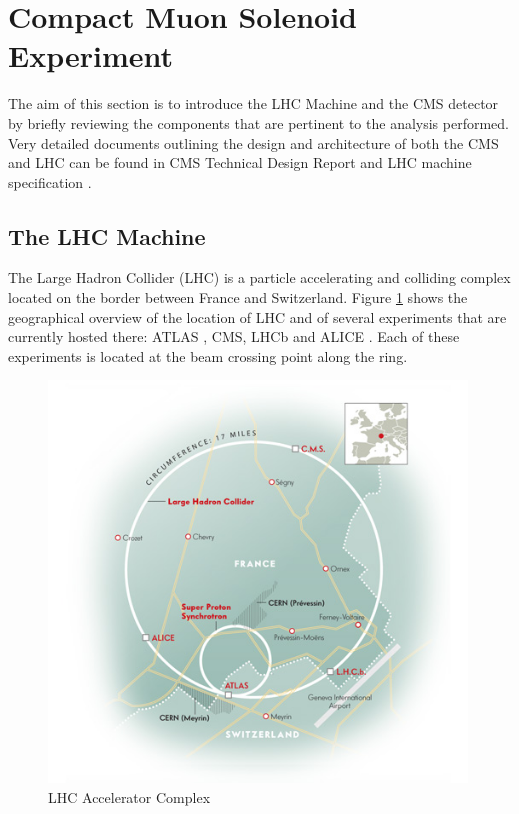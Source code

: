 \section{Compact Muon Solenoid Experiment} \label{section:higgs_cms}
The aim of this section is to introduce the LHC Machine and the CMS detector by  briefly reviewing the components that are pertinent to the analysis performed. Very detailed documents outlining the design and architecture of both the CMS and LHC can be found in CMS Technical Design Report \cite{TDR,CMSExperiment} and LHC machine specification \cite{lhcMachine}.

\subsection{The LHC Machine} \label{subsection:higgs_cms_lhc}
The Large Hadron Collider (LHC) is a particle accelerating and colliding complex located on the border between France and Switzerland. Figure \ref{fig:higgs_cms_lhc} shows the geographical overview of the location of LHC and of several experiments that are currently hosted there: ATLAS \cite{ATLASExperiment}, CMS, LHCb \cite{LHCbExperiment} and ALICE \cite{ALICEExperiment}. Each of these experiments is located at the beam crossing point along the ring.
\begin{figure}[htbp]
    \centering
    \includegraphics[width=0.99\textwidth]{figures/ch_higgs/misc/lhcring.jpg}
    \caption{LHC Accelerator Complex}
    \label{fig:higgs_cms_lhc}
 \end{figure}

